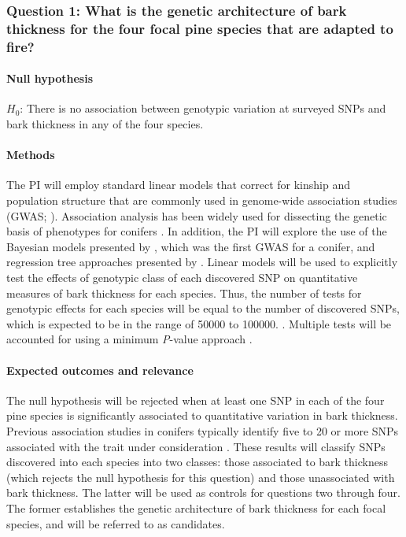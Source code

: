 \subsubsection*{Question 1: What is the genetic architecture of bark thickness for the four focal pine species that 
are adapted to fire?}

\paragraph{Null hypothesis} $H_0$: There is no association between genotypic variation at surveyed SNPs and bark thickness 
in any of the four species.

\paragraph{Methods} The PI will employ standard linear models that correct for kinship and population structure that are 
commonly used in genome-wide association studies (GWAS; \citet{Yu:2006ij}). Association analysis has been widely 
used for dissecting the genetic basis of phenotypes for conifers \citep{Neale:2011jh, Ingvarsson:2011fg}. 
In addition, the PI will explore the use of the Bayesian models presented by \citet{Parchman:2012ca}, which 
was the first GWAS for a conifer, and regression tree approaches presented by \citet{Holliday:2012fz}. 
Linear models will be used to explicitly test the effects of genotypic class of each discovered SNP on quantitative 
measures of bark thickness for each species. Thus, the number of tests for genotypic effects for each species will 
be equal to the number of discovered SNPs, which is expected to be in the range of \num{50000} to \num{100000}. 
\citep{Parchman:2012ca}.  Multiple tests will be accounted for using a minimum \emph{P}-value approach 
\citep{Conneely:2007ga}.

\paragraph{Expected outcomes and relevance} The null hypothesis will be rejected when at least one SNP in each 
of the four pine species is significantly associated to quantitative variation in bark thickness. Previous association 
studies in conifers typically identify five to 20 or more SNPs associated with the trait under consideration 
\citep{Eckert:2012cw}. These results will classify SNPs discovered into each species into two classes: those 
associated to bark thickness (which rejects the null hypothesis for this question) and those unassociated with 
bark thickness. The latter will be used as controls for questions two through four. The former establishes the 
genetic architecture of bark thickness for each focal species, and will be referred to as candidates.

